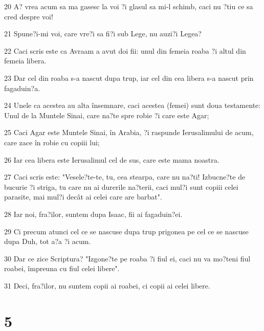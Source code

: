 \par 20 A? vrea acum sa ma gasesc la voi ?i glasul sa mi-l schimb, caci nu ?tiu ce sa cred despre voi!
\par 21 Spune?i-mi voi, care vre?i sa fi?i sub Lege, nu auzi?i Legea?
\par 22 Caci scris este ca Avraam a avut doi fii: unul din femeia roaba ?i altul din femeia libera.
\par 23 Dar cel din roaba s-a nascut dupa trup, iar cel din cea libera s-a nascut prin fagaduin?a.
\par 24 Unele ca acestea au alta însemnare, caci acestea (femei) sunt doua testamente: Unul de la Muntele Sinai, care na?te spre robie ?i care este Agar;
\par 25 Caci Agar este Muntele Sinai, în Arabia, ?i raspunde Ierusalimului de acum, care zace în robie cu copiii lui;
\par 26 Iar cea libera este Ierusalimul cel de sus, care este mama noastra.
\par 27 Caci scris este: "Vesele?te-te, tu, cea stearpa, care nu na?ti! Izbucne?te de bucurie ?i striga, tu care nu ai durerile na?terii, caci mul?i sunt copiii celei parasite, mai mul?i decât ai celei care are barbat".
\par 28 Iar noi, fra?ilor, suntem dupa Isaac, fii ai fagaduin?ei.
\par 29 Ci precum atunci cel ce se nascuse dupa trup prigonea pe cel ce se nascuse dupa Duh, tot a?a ?i acum.
\par 30 Dar ce zice Scriptura? "Izgone?te pe roaba ?i fiul ei, caci nu va mo?teni fiul roabei, împreuna cu fiul celei libere".
\par 31 Deci, fra?ilor, nu suntem copii ai roabei, ci copii ai celei libere.

\chapter{5}

